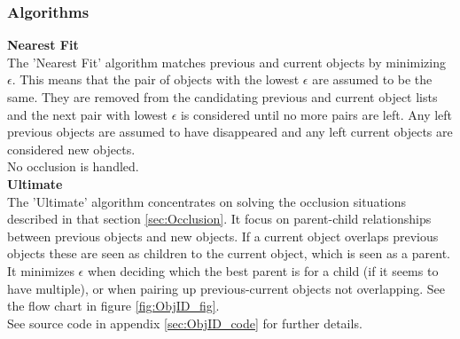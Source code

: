 \subsubsection{Algorithms}
\textbf{Nearest Fit} \\
The 'Nearest Fit' algorithm matches previous and current objects by minimizing $\epsilon$. This means that the pair of objects with the lowest $\epsilon$ are assumed to be the same. They are removed from the candidating previous and current object lists and the next pair with lowest $\epsilon$ is considered until no more pairs are left. Any left previous objects are assumed to have disappeared and any left current objects are considered new objects. \\
No occlusion is handled. \\
\newline
\textbf{Ultimate}\\
The 'Ultimate' algorithm concentrates on solving the occlusion situations described in that section \ref{sec:Occlusion}. It focus on parent-child relationships between previous objects and new objects. If a current object overlaps previous objects these are seen as children to the current object, which is seen as a parent. It minimizes $\epsilon$ when deciding which the best parent is for a child (if it seems to have multiple), or when pairing up previous-current objects not overlapping. See the flow chart in figure \ref{fig:ObjID_fig}. \\
\newline
See source code in appendix \ref{sec:ObjID_code} for further details. %

